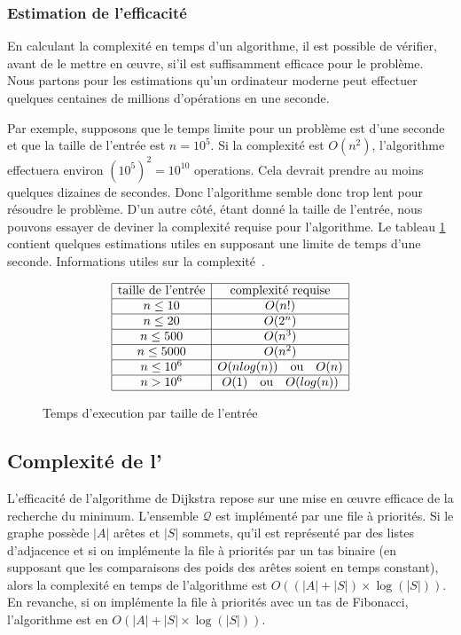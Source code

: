 \subsubsection{Estimation de l'efficacité}
En calculant la complexité en temps d'un algorithme, il est possible de vérifier, avant de le mettre en œuvre, si'il est suffisamment efficace pour le problème. Nous partons pour les estimations qu'un ordinateur moderne peut effectuer quelques centaines de millions d'opérations en une seconde.

Par exemple, supposons que le temps limite pour un problème est d'une seconde et que la taille de l'entrée est $n = 10^{5}$.  Si la complexité est $O(n^{2})$, l'algorithme effectuera environ ${(10^{5})}^2 = 10^{10}$ operations.
Cela devrait prendre au moins quelques dizaines de secondes. Donc l'algorithme semble donc trop lent pour résoudre le problème.
D'un autre côté, étant donné la taille de l'entrée, nous pouvons essayer de deviner la complexité requise pour l'algorithme.
Le tableau \ref{fig:time_tab} contient quelques estimations utiles en supposant une limite de temps d'une seconde.
Informations utiles sur la complexité~\cite[p.~20]{comp.prog.book}.
\begin{figure}
  \[
  \begin{array}{|c|c|}
    \hline
    \text{taille de l'entrée} & \text{complexité requise} \\
    \hline
    n \leq 10 & O(n!) \\
    \hline
    n \leq 20 & O(2^n) \\
    \hline
    n \leq 500 & O(n^3) \\
    \hline
    n \leq 5000 & O(n^2) \\
    \hline
    n \leq {10}^6 & O(nlog(n)) \quad \text{ou} \quad O(n) \\
    \hline
    n > {10^6} & O(1)\quad \text{ou} \quad O(log(n)) \\
    \hline
  \end{array}
  \]
  \caption{Temps d'execution par taille de l'entrée}\label{fig:time_tab}
\end{figure}
\subsection{Complexité de l'\algo}
L'efficacité de l'algorithme de Dijkstra repose sur une mise en œuvre efficace
de la recherche du minimum. L'ensemble $\mathcal{Q}$ est implémenté par une
file à priorités. Si le graphe possède $\lvert A \rvert$ arêtes et $\lvert S \rvert$
sommets, qu'il est représenté par des listes d'adjacence et si on implémente
la file à priorités par un tas binaire (en supposant que les comparaisons des
poids des arêtes soient en temps constant), alors la complexité en temps de
l'algorithme est $O((\lvert A \rvert + \lvert S \rvert)\times \log(\lvert S \rvert))$.
En revanche, si on implémente la file à priorités avec un tas de Fibonacci,
l'algorithme est en $O(\lvert A \rvert + \lvert S \rvert \times \log(\lvert S \rvert))$.
